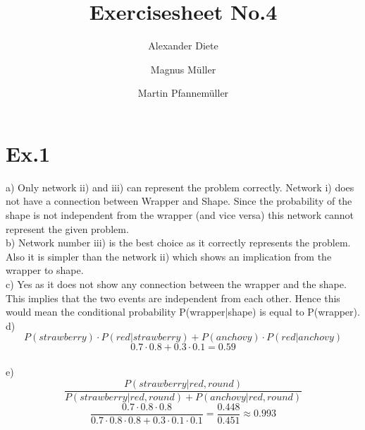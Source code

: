 \documentclass[11pt]{article}
\title{Exercisesheet No.4}
\author{Alexander Diete \and Magnus M\"uller \and Martin Pfannem\"uller}
\begin{document}
\maketitle

\section*{Ex.1}
a) Only network ii) and iii) can represent the problem correctly. Network i) does not have a connection between Wrapper and Shape. Since the probability of the shape is not independent from the wrapper (and vice versa) this network cannot represent the given problem. \\

b) Network number iii) is the best choice as it correctly represents the problem. Also it is simpler than the network ii) which shows an implication from the wrapper to shape. \\

c) Yes as it does not show any connection between the wrapper and the shape. This implies that the two events are independent from each other. Hence this would mean the conditional probability P(wrapper|shape) is equal to P(wrapper). \\

d) 
$$P(strawberry) \cdot P(red|strawberry) + P(anchovy) \cdot P(red|anchovy)$$
$$0.7 \cdot 0.8 + 0.3 \cdot 0.1 = 0.59$$ \\

e)
$$\frac{P(strawberry | red, round)}{P(strawberry | red, round) + P(anchovy | red, round)}$$
$$\frac{0.7 \cdot 0.8 \cdot 0.8}{0.7 \cdot 0.8 \cdot 0.8 + 0.3 \cdot 0.1 \cdot 0.1} = \frac{0.448}{0.451} \approx 0.993$$
\end{document}
